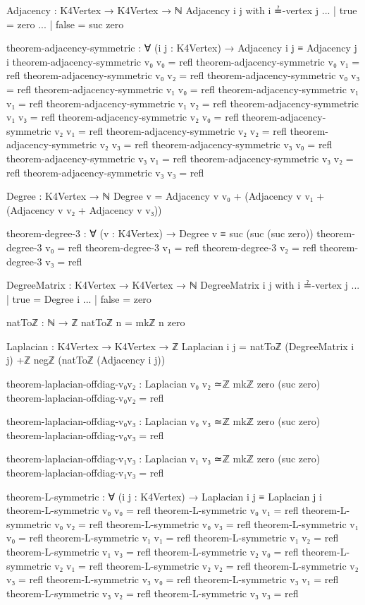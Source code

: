 \documentclass[11pt,a4paper]{book}
\begin{document}
\begin{code}
Adjacency : K4Vertex → K4Vertex → ℕ
Adjacency i j with i ≟-vertex j
... | true  = zero
... | false = suc zero

theorem-adjacency-symmetric : ∀ (i j : K4Vertex) → Adjacency i j ≡ Adjacency j i
theorem-adjacency-symmetric v₀ v₀ = refl
theorem-adjacency-symmetric v₀ v₁ = refl
theorem-adjacency-symmetric v₀ v₂ = refl
theorem-adjacency-symmetric v₀ v₃ = refl
theorem-adjacency-symmetric v₁ v₀ = refl
theorem-adjacency-symmetric v₁ v₁ = refl
theorem-adjacency-symmetric v₁ v₂ = refl
theorem-adjacency-symmetric v₁ v₃ = refl
theorem-adjacency-symmetric v₂ v₀ = refl
theorem-adjacency-symmetric v₂ v₁ = refl
theorem-adjacency-symmetric v₂ v₂ = refl
theorem-adjacency-symmetric v₂ v₃ = refl
theorem-adjacency-symmetric v₃ v₀ = refl
theorem-adjacency-symmetric v₃ v₁ = refl
theorem-adjacency-symmetric v₃ v₂ = refl
theorem-adjacency-symmetric v₃ v₃ = refl

Degree : K4Vertex → ℕ
Degree v = Adjacency v v₀ + (Adjacency v v₁ + (Adjacency v v₂ + Adjacency v v₃))

theorem-degree-3 : ∀ (v : K4Vertex) → Degree v ≡ suc (suc (suc zero))
theorem-degree-3 v₀ = refl
theorem-degree-3 v₁ = refl
theorem-degree-3 v₂ = refl
theorem-degree-3 v₃ = refl

DegreeMatrix : K4Vertex → K4Vertex → ℕ
DegreeMatrix i j with i ≟-vertex j
... | true  = Degree i
... | false = zero

natToℤ : ℕ → ℤ
natToℤ n = mkℤ n zero

Laplacian : K4Vertex → K4Vertex → ℤ
Laplacian i j = natToℤ (DegreeMatrix i j) +ℤ negℤ (natToℤ (Adjacency i j))






theorem-laplacian-offdiag-v₀v₂ : Laplacian v₀ v₂ ≃ℤ mkℤ zero (suc zero)
theorem-laplacian-offdiag-v₀v₂ = refl

theorem-laplacian-offdiag-v₀v₃ : Laplacian v₀ v₃ ≃ℤ mkℤ zero (suc zero)
theorem-laplacian-offdiag-v₀v₃ = refl


theorem-laplacian-offdiag-v₁v₃ : Laplacian v₁ v₃ ≃ℤ mkℤ zero (suc zero)
theorem-laplacian-offdiag-v₁v₃ = refl









theorem-L-symmetric : ∀ (i j : K4Vertex) → Laplacian i j ≡ Laplacian j i
theorem-L-symmetric v₀ v₀ = refl
theorem-L-symmetric v₀ v₁ = refl
theorem-L-symmetric v₀ v₂ = refl
theorem-L-symmetric v₀ v₃ = refl
theorem-L-symmetric v₁ v₀ = refl
theorem-L-symmetric v₁ v₁ = refl
theorem-L-symmetric v₁ v₂ = refl
theorem-L-symmetric v₁ v₃ = refl
theorem-L-symmetric v₂ v₀ = refl
theorem-L-symmetric v₂ v₁ = refl
theorem-L-symmetric v₂ v₂ = refl
theorem-L-symmetric v₂ v₃ = refl
theorem-L-symmetric v₃ v₀ = refl
theorem-L-symmetric v₃ v₁ = refl
theorem-L-symmetric v₃ v₂ = refl
theorem-L-symmetric v₃ v₃ = refl


\end{code}
\end{document}
